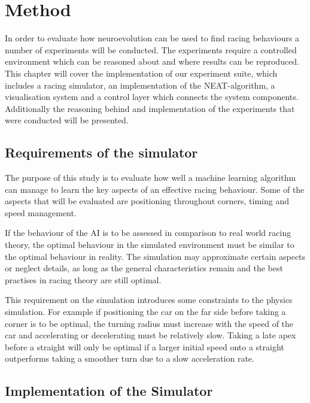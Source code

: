
\chapter{Method}

In order to evaluate how neuroevolution can be used to find racing behaviours a number of experiments will be conducted. The experiments require a controlled environment which can be reasoned about and where results can be reproduced. This chapter will cover the implementation of our experiment suite, which includes a racing simulator, an implementation of the NEAT-algorithm, a visualisation system and a control layer which connects the system components. Additionally the reasoning behind and implementation of the experiments that were conducted will be presented. 

\section{Requirements of the simulator}

The purpose of this study is to evaluate how well a machine learning algorithm can manage to learn the key aspects of an effective racing behaviour. Some of the aspects that will be evaluated are positioning throughout corners, timing and speed management. 

If the behaviour of the AI is to be assessed in comparison to real world racing theory, the optimal behaviour in the simulated environment must be similar to the optimal behaviour in reality. The simulation may approximate certain aspects or neglect details, as long as the general characteristics remain and the best practises in racing theory are still optimal. %

This requirement on the simulation introduces some constraints to the physics simulation. For example if positioning the car on the far side before taking a corner is to be optimal, the turning radius must increase with the speed of the car and accelerating or decelerating must be relatively slow. Taking a late apex before a straight will only be optimal if a larger initial speed onto a straight outperforms taking a smoother turn due to a slow acceleration rate. 


\section{Implementation of the Simulator}


